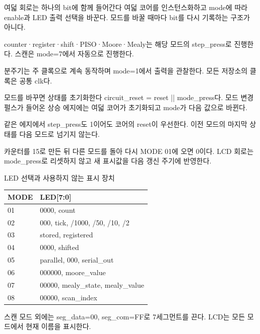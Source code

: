 \begin{frame}{여덟 회로는 하나의 bit에 함께 들어간다}
\small
여덟 코어를 인스턴스화하고 mode에 따라 enable과 LED 출력 선택을 바꾼다. 모드를 바꿀 때마다 bit를 다시 기록하는 구조가 아니다.\par\vspace{0.26cm}counter·register·shift·PISO·Moore·Mealy는 해당 모드의 step\_press로 진행한다. 스캔은 mode=7에서 자동으로 진행한다.\par\vspace{0.26cm}분주기는 주 클록으로 계속 동작하며 mode=1에서 출력을 관찰한다. 모든 저장소의 클록은 공통 clk다.\par
\end{frame}

\begin{frame}{모드를 바꾸면 상태를 초기화한다}
\small
circuit\_reset = reset || mode\_press다. 모드 변경 펄스가 들어온 상승 에지에는 여덟 코어가 초기화되고 mode가 다음 값으로 바뀐다.\par\vspace{0.26cm}같은 에지에서 step\_press도 1이어도 코어의 reset이 우선한다. 이전 모드의 마지막 상태를 다음 모드로 넘기지 않는다.\par\vspace{0.26cm}카운터를 15로 만든 뒤 다른 모드를 돌아 다시 MODE 01에 오면 0이다. LCD 회로는 mode\_press로 리셋하지 않고 새 표시값을 다음 갱신 주기에 반영한다.\par
\end{frame}

\begin{frame}{LED 선택과 사용하지 않는 표시 장치}
\small
\begin{center}\renewcommand{\arraystretch}{1.3}\begin{tabular}{ll}
MODE & LED[7:0]\\\hline
01 & 0000, count\\
02 & 000, tick, /1000, /50, /10, /2\\
03 & stored, registered\\
04 & 0000, shifted\\
05 & parallel, 000, serial\_out\\
06 & 000000, moore\_value\\
07 & 00000, mealy\_state, mealy\_value\\
08 & 00000, scan\_index\\
\end{tabular}\end{center}스캔 모드 외에는 seg\_data=00, seg\_com=FF로 7세그먼트를 끈다. LCD는 모든 모드에서 현재 이름을 표시한다.\par
\end{frame}

